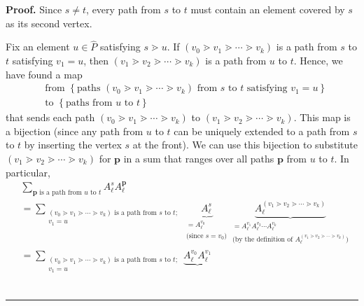 \documentclass[numbers=enddot,12pt,final,onecolumn,notitlepage]{scrartcl}%
\theoremstyle{definition}
\newenvironment{vershort}{}{}
\newcommand{\downslack}{A}
\newenvironment{proof}[1][Proof]{\noindent\textbf{#1.} }{\ \rule{0.5em}{0.5em}}
\let\sumnonlimits\sum
\renewcommand{\sum}{\sumnonlimits\limits}
\begin{document}
\begin{vershort}


\begin{proof}
Since $s\neq t$, every path from $s$ to $t$ must contain an element covered by
$s$ as its second vertex.

Fix an element $u\in\widehat{P}$ satisfying $s\gtrdot u$. If $\left(
v_{0}\gtrdot v_{1}\gtrdot\cdots\gtrdot v_{k}\right)  $ is a path from $s$ to
$t$ satisfying $v_{1}=u$, then $\left(  v_{1}\gtrdot v_{2}\gtrdot\cdots\gtrdot
v_{k}\right)  $ is a path from $u$ to $t$. Hence, we have found a map
\begin{align*}
&  \text{from }\left\{  \text{paths }\left(  v_{0}\gtrdot v_{1}\gtrdot
\cdots\gtrdot v_{k}\right)  \text{ from }s\text{ to }t\text{ satisfying }%
v_{1}=u\right\} \\
&  \text{to }\left\{  \text{paths from }u\text{ to }t\right\}
\end{align*}
that sends each path $\left(  v_{0}\gtrdot v_{1}\gtrdot\cdots\gtrdot
v_{k}\right)  $ to $\left(  v_{1}\gtrdot v_{2}\gtrdot\cdots\gtrdot
v_{k}\right)  $. This map is a bijection (since any path from $u$ to $t$ can
be uniquely extended to a path from $s$ to $t$ by inserting the vertex $s$ at
the front). We can use this bijection to substitute $\left(  v_{1}\gtrdot
v_{2}\gtrdot\cdots\gtrdot v_{k}\right)  $ for $\mathbf{p}$ in a sum that
ranges over all paths $\mathbf{p}$ from $u$ to $t$. In particular,%
\begin{align}
&  \sum_{\mathbf{p}\text{ is a path from }u\text{ to }t}\downslack_{\ell}%
^{s}\downslack_{\ell}^{\mathbf{p}}\nonumber\\
&  =\sum_{\substack{\left(  v_{0}\gtrdot v_{1}\gtrdot\cdots\gtrdot
v_{k}\right)  \text{ is a path from }s\text{ to }t;\\v_{1}=u}%
}\underbrace{\downslack_{\ell}^{s}}_{\substack{=\downslack_{\ell}^{v_{0}%
}\\\text{(since }s=v_{0}\text{)}}}\underbrace{\downslack_{\ell}^{\left(
v_{1}\gtrdot v_{2}\gtrdot\cdots\gtrdot v_{k}\right)  }}%
_{\substack{=\downslack_{\ell}^{v_{1}}\downslack_{\ell}^{v_{2}}\cdots
\downslack_{\ell}^{v_{k}}\\\text{(by the definition of }\downslack_{\ell
}^{\left(  v_{1}\gtrdot v_{2}\gtrdot\cdots\gtrdot v_{k}\right)  }\text{)}%
}}\nonumber\\
&  =\sum_{\substack{\left(  v_{0}\gtrdot v_{1}\gtrdot\cdots\gtrdot
v_{k}\right)  \text{ is a path from }s\text{ to }t;\\v_{1}=u}%
}\underbrace{\downslack_{\ell}^{v_{0}}\downslack_{\ell}^{v_{1}}%
}
\end{align}
\end{proof}
\end{vershort}
\end{document}
